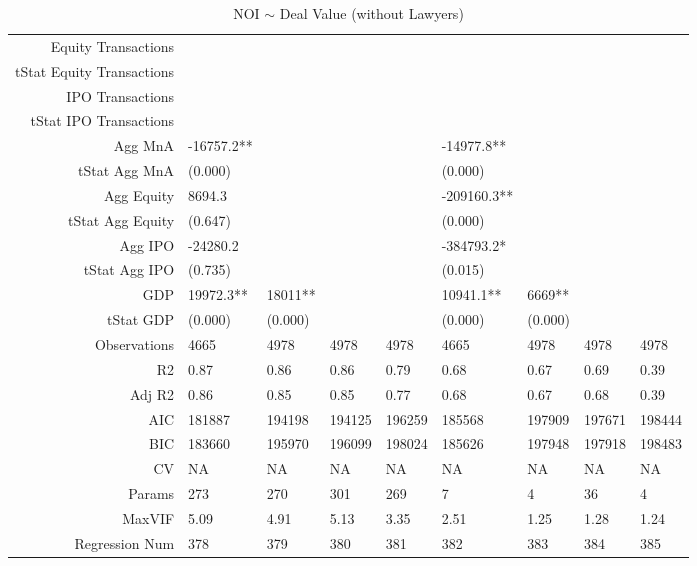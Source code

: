 \begin{table}[ht]
\begin{tabular}{rllllllll}
  Equity Transactions &  &  &  &  &  &  &  &  \\ 
  tStat Equity Transactions &  &  &  &  &  &  &  &  \\ 
  IPO Transactions &  &  &  &  &  &  &  &  \\ 
  tStat IPO Transactions &  &  &  &  &  &  &  &  \\ 
  Agg MnA & -16757.2** &  &  &  & -14977.8** &  &  &  \\ 
  tStat Agg MnA & (0.000) &  &  &  & (0.000) &  &  &  \\ 
  Agg Equity & 8694.3 &  &  &  & -209160.3** &  &  &  \\ 
  tStat Agg Equity & (0.647) &  &  &  & (0.000) &  &  &  \\ 
  Agg IPO & -24280.2 &  &  &  & -384793.2* &  &  &  \\ 
  tStat Agg IPO & (0.735) &  &  &  & (0.015) &  &  &  \\ 
  GDP & 19972.3** & 18011** &  &  & 10941.1** & 6669** &  &  \\ 
  tStat GDP & (0.000) & (0.000) &  &  & (0.000) & (0.000) &  &  \\ 
  Observations & 4665 & 4978 & 4978 & 4978 & 4665 & 4978 & 4978 & 4978 \\ 
  R2 & 0.87 & 0.86 & 0.86 & 0.79 & 0.68 & 0.67 & 0.69 & 0.39 \\ 
  Adj R2 & 0.86 & 0.85 & 0.85 & 0.77 & 0.68 & 0.67 & 0.68 & 0.39 \\ 
  AIC & 181887 & 194198 & 194125 & 196259 & 185568 & 197909 & 197671 & 198444 \\ 
  BIC & 183660 & 195970 & 196099 & 198024 & 185626 & 197948 & 197918 & 198483 \\ 
  CV & NA & NA & NA & NA & NA & NA & NA & NA \\ 
  Params & 273 & 270 & 301 & 269 & 7 & 4 & 36 & 4 \\ 
  MaxVIF & 5.09 & 4.91 & 5.13 & 3.35 & 2.51 & 1.25 & 1.28 & 1.24 \\ 
  Regression Num & 378 & 379 & 380 & 381 & 382 & 383 & 384 & 385 \\ 
   \hline
\end{tabular}
\caption{NOI $\sim$ Deal Value (without Lawyers)} 
\end{table}
